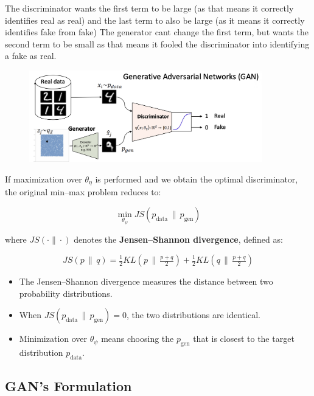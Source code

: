 \documentclass[11pt]{article}
\begin{document}
The discriminator wants the first term to be large (as that means it correctly identifies real as real)
and the last term to also be large (as it means it correctly identifies fake from fake)
\medskip
The generator cant change the first term, but wants the second term to be small as that means it fooled the discriminator into identifying a fake as real.

\pagebreak

\begin{figure}[h]
	\centering
	\includegraphics[width=0.9\textwidth]{../imgs/gan-optimization.png} %
\end{figure}


If maximization over $\theta_\eta$ is performed and we obtain the optimal discriminator,
the original min--max problem reduces to:

\[
	\min_{\theta_\psi} JS(p_{\text{data}} \,\|\, p_{\text{gen}})
\]

where $JS(\cdot \| \cdot)$ denotes the \textbf{Jensen--Shannon divergence}, defined as:

\[
	JS(p \,\|\, q) = \tfrac{1}{2} KL\!\left(p \,\Big\|\, \tfrac{p + q}{2}\right)
	+ \tfrac{1}{2} KL\!\left(q \,\Big\|\, \tfrac{p + q}{2}\right)
\]

\begin{itemize}
	\item The Jensen--Shannon divergence measures the distance between two probability distributions.
	\item When $JS(p_{\text{data}} \,\|\, p_{\text{gen}}) = 0$, the two distributions are identical.
	\item Minimization over $\theta_\psi$ means choosing the $p_{\text{gen}}$ that is closest to the target distribution $p_{\text{data}}$.
\end{itemize}


\subsection*{GAN's Formulation}
\end{document}
